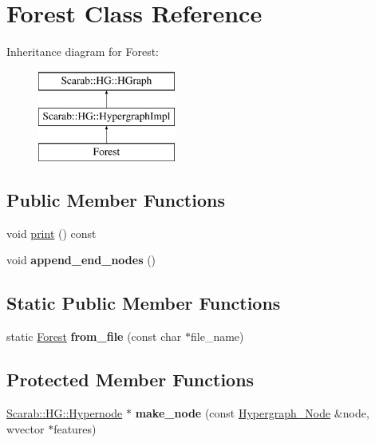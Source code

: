 \hypertarget{classForest}{
\section{Forest Class Reference}
\label{classForest}
}
Inheritance diagram for Forest:\begin{figure}[H]
\begin{center}
\leavevmode
\includegraphics[height=3cm]{classForest}
\end{center}
\end{figure}
\subsection*{Public Member Functions}
\begin{DoxyCompactItemize}
\item 
void \hyperlink{classForest_a621a1a65d0f877bb33b15c79f9e24c4d}{print} () const 
\item 
\hypertarget{classForest_a4cc0cf94c18913eadd0b36f3dcf68cef}{
void {\bfseries append\_\-end\_\-nodes} ()}
\label{classForest_a4cc0cf94c18913eadd0b36f3dcf68cef}

\end{DoxyCompactItemize}
\subsection*{Static Public Member Functions}
\begin{DoxyCompactItemize}
\item 
\hypertarget{classForest_a1b9ddc0e03c1ccfcc73987fe9378fa84}{
static \hyperlink{classForest}{Forest} {\bfseries from\_\-file} (const char $\ast$file\_\-name)}
\label{classForest_a1b9ddc0e03c1ccfcc73987fe9378fa84}

\end{DoxyCompactItemize}
\subsection*{Protected Member Functions}
\begin{DoxyCompactItemize}
\item 
\hypertarget{classForest_ab40070ea9e3885d252fb7848c11f27ef}{
\hyperlink{classScarab_1_1HG_1_1Hypernode}{Scarab::HG::Hypernode} $\ast$ {\bfseries make\_\-node} (const \hyperlink{classHypergraph__Node}{Hypergraph\_\-Node} \&node, wvector $\ast$features)}
\label{classForest_ab40070ea9e3885d252fb7848c11f27ef}

\end{DoxyCompactItemize}


